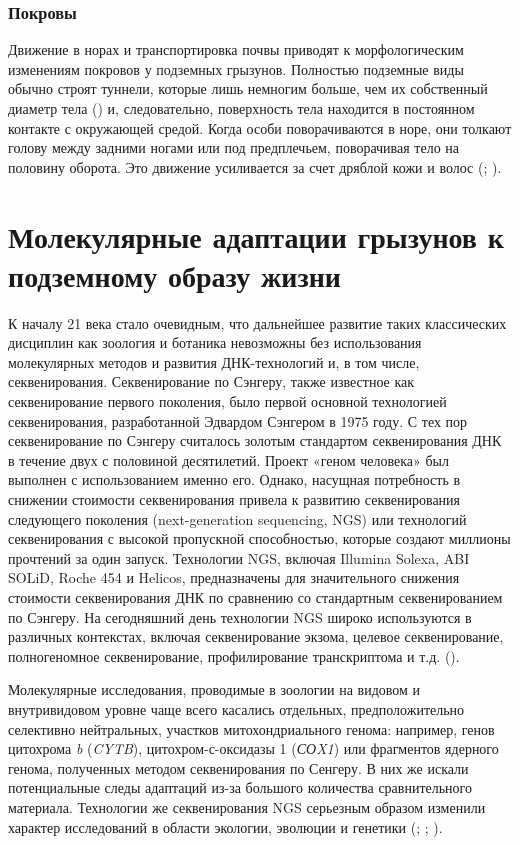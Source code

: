 \subsubsection{Покровы}

Движение в норах и транспортировка почвы приводят к морфологическим изменениям покровов у подземных грызунов. Полностью подземные виды обычно строят туннели, которые лишь немногим больше, чем их собственный диаметр тела (\cite{Andersen1982}) и, следовательно, поверхность тела находится в постоянном контакте с окружающей средой. Когда особи поворачиваются в норе, они толкают голову между задними ногами или под предплечьем, поворачивая тело на половину оборота. Это движение усиливается за счет дряблой кожи и волос (\cite{Nevo1979}; \cite{Tucker1981}). 

\section{Молекулярные адаптации грызунов к подземному образу жизни}

К началу 21 века стало очевидным, что дальнейшее развитие таких классических дисциплин как зоология и ботаника невозможны без использования молекулярных методов и развития ДНК-технологий и, в том числе, секвенирования. Секвенирование по Сэнгеру, также известное как секвенирование первого поколения, было первой основной технологией секвенирования, разработанной Эдвардом Сэнгером в 1975 году. С тех пор секвенирование по Сэнгеру считалось золотым стандартом секвенирования ДНК в течение двух с половиной десятилетий. Проект «геном человека» был выполнен с использованием именно его. Однако, насущная потребность в снижении стоимости секвенирования привела к развитию секвенирования следующего поколения (next-generation sequencing, NGS) или технологий секвенирования с высокой пропускной способностью, которые создают миллионы прочтений за один запуск. Технологии NGS, включая Illumina Solexa, ABI SOLiD, Roche 454 и Helicos, предназначены для значительного снижения стоимости секвенирования ДНК по сравнению со стандартным секвенированием по Сэнгеру. На сегодняшний день технологии NGS широко используются в различных контекстах, включая секвенирование экзома, целевое секвенирование, полногеномное секвенирование, профилирование транскриптома и т.д. (\cite{Fang2015}).
 
Молекулярные исследования, проводимые в зоологии на видовом и внутривидовом уровне чаще всего касались отдельных, предположительно селективно нейтральных, участков митохондриального генома: например, генов цитохрома \textit{b} (\textit{CYTB}), цитохром-с-оксидазы 1 (\textit{СОX1}) или фрагментов ядерного генома, полученных методом секвенирования по Сенгеру. В них же искали потенциальные следы адаптаций из-за большого количества сравнительного материала. Технологии же секвенирования NGS серьезным образом изменили характер исследований в области экологии, эволюции и генетики (\cite{Hudson2008}; \cite{Stapley2010}; \cite{Rokas2009}).

